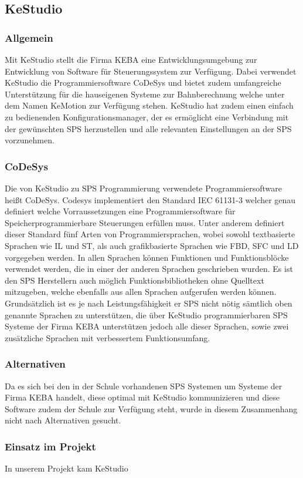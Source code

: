 \subsection{KeStudio}
\subsubsection{Allgemein}
Mit KeStudio stellt die Firma KEBA eine Entwicklungsumgebung zur Entwicklung von Software für Steuerungssystem zur Verfügung. Dabei verwendet KeStudio die Programmiersoftware CoDeSys und bietet zudem umfangreiche Unterstützung für die hauseigenen Systeme zur Bahnberechnung welche unter dem Namen KeMotion zur Verfügung stehen. KeStudio hat zudem einen einfach zu bedienenden Konfigurationsmanager, der es ermöglicht eine Verbindung mit der gewünschten SPS herzustellen und alle relevanten Einstellungen an der SPS vorzunehmen.
\subsubsection{CoDeSys}
Die von KeStudio zu SPS Programmierung verwendete Programmiersoftware heißt CoDeSys. Codesys implementiert den Standard IEC 61131-3 welcher genau definiert welche Vorraussetzungen eine Programmiersoftware für Speicherprogrammierbare Steuerungen erfüllen muss. Unter anderem definiert dieser Standard fünf Arten von Programmiersprachen, wobei sowohl textbasierte Sprachen wie IL und ST, als auch grafikbasierte Sprachen wie FBD, SFC und LD vorgegeben werden. In allen Sprachen können Funktionen und Funktionsblöcke verwendet werden, die in einer der anderen Sprachen geschrieben wurden. Es ist den SPS Herstellern auch möglich Funktionsbibliotheken ohne Quelltext mitzugeben, welche ebenfalls aus allen Sprachen aufgerufen werden können.
Grundsätzlich ist es je nach Leistungsfähigkeit er SPS nicht nötig sämtlich oben genannte Sprachen zu unterstützen, die über KeStudio programmierbaren SPS Systeme der Firma KEBA unterstützen jedoch alle dieser Sprachen, sowie zwei zusätzliche Sprachen mit verbessertem Funktionsumfang.
\subsubsection{Alternativen}
Da es sich bei den in der Schule vorhandenen SPS Systemen um Systeme der Firma KEBA handelt, diese optimal mit KeStudio kommunizieren und diese Software zudem der Schule zur Verfügung steht, wurde in diesem Zusammenhang nicht nach Alternativen gesucht.
\subsubsection{Einsatz im Projekt}
In unserem Projekt kam KeStudio
